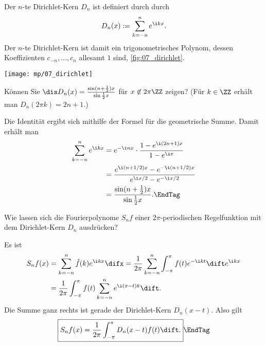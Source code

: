   \begin{antwort}
    Der $n$-te Dirichlet-Kern $D_n$ ist definiert durch 
    durch
    \[
    D_n(x):=\sum_{k=-n}^n e^{\i kx}.
    \]
    Der $n$-te Dirichlet-Kern ist damit ein trigonometrisches Polynom, dessen 
    Koeffizienten $c_{-n},\ldots, c_n$ allesamt $1$ sind, 
    \sieheAbbildung\ref{fig:07_dirichlet}.
    \AntEnd

    \begin{center}
      \texttt{[image: mp/07\_dirichlet]}
      \label{fig:07_dirichlet}
    \end{center}
  \end{antwort}


  \begin{frage} Können Sie $\dis D_n(x)=\frac{\sin(n+\frac{1}{2})x}{
      \sin\frac{1}{2}x}$ für $x\not\in 2\pi\ZZ$ zeigen? (Für $k\in \ZZ$ erhält 
    man $D_n(2\pi k)=2n+1$.)
  \end{frage}

  \begin{antwort}[]
    \Ant Die Identität ergibt sich mithilfe der Formel für die geometrische Summe. 
    Damit erhält man
    \begin{align*}
      \sum_{k=-n}^n e^{\i kx} &=
      e^{-\i nx}\cdot \frac{1-e^{\i (2n+1)x}}{1-e^{\i x}} \\
      &=
      \frac{e^{\i (n+1/2)x}-e^{-\i (n+1/2)x}}{e^{\i x/2}-e^{-\i x/2}} \\
      &=
      \frac{\sin(n+\frac{1}{2})x}{\sin\frac{1}{2}x}. \EndTag
    \end{align*}
  \end{antwort}

  \begin{frage}\label{07_kerndarstellung}
    Wie lassen sich die Fourierpolynome $S_n f$ einer 
    $2\pi$-periodischen Regelfunktion mit dem Dirichlet-Kern 
    $D_n$ ausdrücken?
  \end{frage}

  \begin{antwort}
    Es ist 
    \begin{align*}
      S_n f (x) &= \sum_{k=-n}^n \hat{f}(k) e^{\i kx} \difx = 
      \frac{1}{2\pi}\sum_{k=-n}^n \int_{-\pi}^\pi f(t) e^{-\i kt}\dift e^{\i kx} \\
      &=\frac{1}{2\pi} \int_{-\pi}^\pi f(t) \sum_{k=-n}^n e^{\i (x-t)k} \dift.
    \end{align*}
    Die Summe ganz rechts ist gerade der Dirichlet-Kern 
    $D_n(x-t)$. Also gilt 
    \begin{equation}
      \boxed{ 
        S_n f (x) = \frac{1}{2\pi} \int_{-\pi}^\pi D_n (x-t) f(t) \dift.
      }
      \EndTag
    \end{equation}
  \end{antwort}

